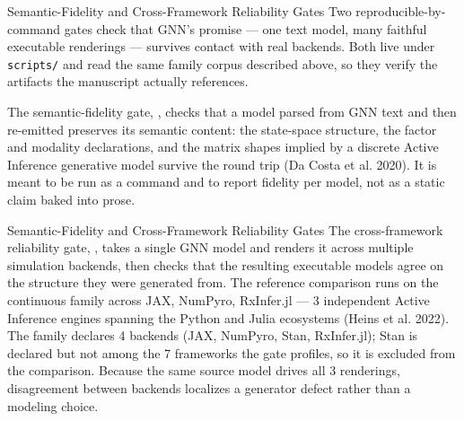 \documentclass[
  ignorenonframetext,
]{beamer}
\begin{document}
\begin{frame}{Semantic-Fidelity and
Cross-Framework Reliability Gates}
\protect{}\label{semantic-fidelity-and-cross-framework-reliability-gates}
Two reproducible-by-command gates check that GNN's promise --- one text
model, many faithful executable renderings --- survives contact with
real backends. Both live under \texttt{scripts/} and read the same
family corpus described above, so they verify the artifacts the
manuscript actually references.

The semantic-fidelity gate,
, checks that a model
parsed from GNN text and then re-emitted preserves its semantic content:
the state-space structure, the factor and modality declarations, and the
matrix shapes implied by a discrete Active Inference generative model
survive the round trip (Da Costa et al. 2020). It is meant to be run as
a command and to report fidelity per model, not as a static claim baked
into prose.

\end{frame}

\begin{frame}{Semantic-Fidelity and
Cross-Framework Reliability Gates}
The cross-framework reliability gate,
, takes a single
GNN model and renders it across multiple simulation backends, then
checks that the resulting executable models agree on the structure they
were generated from. The reference comparison runs on the continuous
family across JAX, NumPyro, RxInfer.jl --- 3 independent Active
Inference engines spanning the Python and Julia ecosystems (Heins et al.
2022). The family declares 4 backends (JAX, NumPyro, Stan, RxInfer.jl);
Stan is declared but not among the 7 frameworks the gate profiles, so it
is excluded from the comparison. Because the same source model drives
all 3 renderings, disagreement between backends localizes a generator
defect rather than a modeling choice.

\end{frame}
\end{document}
